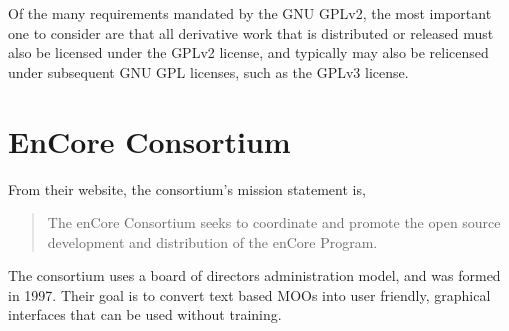 \documentclass[12pt, letterpaper]{report}
\begin{document}
\par
Of the many requirements mandated by the GNU GPLv2, the most important one to consider are that all derivative work that is distributed or released must also be licensed under the GPLv2 license, and typically may also be relicensed under subsequent GNU GPL licenses, such as the GPLv3 license. \cite{GPLv2}

\section{EnCore Consortium}
\par

\par 
From their website, the consortium's mission statement is,

\begin{quotation}
The enCore Consortium seeks to coordinate and promote the open source development and distribution of the enCore Program.
\end{quotation}

\par
The consortium uses a board of directors administration model, and was formed in 1997. Their goal is to convert text based MOOs into user friendly, graphical interfaces that can be used without training.
\end{document}
